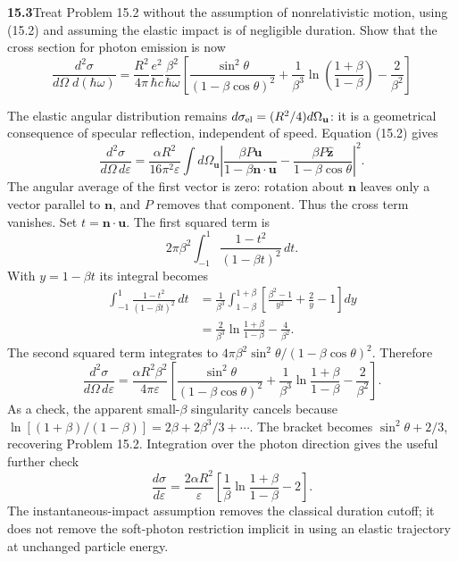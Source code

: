 \par\bigskip
\noindent\textbf{15.3}\quad Treat Problem 15.2 without the assumption of nonrelativistic motion, using (15.2) and assuming the elastic impact is of negligible duration. Show that the cross section for photon emission is now
\[
\frac{d^{2}\sigma}{d\Omega\;d(\hbar\omega)}=\frac{R^{2}}{4\pi}\frac{e^{2}}{\hbar c}\frac{\beta^{2}}{\hbar\omega}\left[\frac{\sin^{2}\theta}{(1-\beta\cos\theta)^{2}}+\frac{1}{\beta^{3}}\ln\!\left(\frac{1+\beta}{1-\beta}\right)-\frac{2}{\beta^{2}}\right]
\]
\solution

The elastic angular distribution remains $d\sigma_{\rm el}
=(R^2/4)d\Omega_{\mathbf u}$: it is a geometrical consequence of
specular reflection, independent of speed.  Equation (15.2) gives
\[
\frac{d^2\sigma}{d\Omega\,d\varepsilon}
=\frac{\alpha R^2}{16\pi^2\varepsilon}
\int d\Omega_{\mathbf u}\left|
 \frac{\beta P\mathbf u}{1-\beta\mathbf n\cdot\mathbf u}
 -\frac{\beta P\widehat{\mathbf z}}{1-\beta\cos\theta}
\right|^2.
\]
The angular average of the first vector is zero: rotation about
$\mathbf n$ leaves only a vector parallel to $\mathbf n$, and $P$
removes that component.  Thus the cross term vanishes.  Set
$t=\mathbf n\cdot\mathbf u$.  The first squared term is
\[
2\pi\beta^2\int_{-1}^{1}\frac{1-t^2}{(1-\beta t)^2}\,dt.
\]
With $y=1-\beta t$ its integral becomes
\begin{align*}
\int_{-1}^{1}\frac{1-t^2}{(1-\beta t)^2}\,dt
&=\frac1{\beta^3}\int_{1-\beta}^{1+\beta}
 \left[\frac{\beta^2-1}{y^2}+\frac2y-1\right]dy\\
&=\frac2{\beta^3}\ln\frac{1+\beta}{1-\beta}
 -\frac4{\beta^2}.
\end{align*}
The second squared term integrates to
$4\pi\beta^2\sin^2\theta/(1-\beta\cos\theta)^2$.
Therefore
\[
\boxed{\frac{d^2\sigma}{d\Omega\,d\varepsilon}
=\frac{\alpha R^2\beta^2}{4\pi\varepsilon}
\left[\frac{\sin^2\theta}{(1-\beta\cos\theta)^2}
 +\frac1{\beta^3}\ln\frac{1+\beta}{1-\beta}
 -\frac2{\beta^2}\right].}
\]
As a check, the apparent small-$\beta$ singularity cancels because
$\ln[(1+\beta)/(1-\beta)]=2\beta+2\beta^3/3+\cdots$.
The bracket becomes $\sin^2\theta+2/3$, recovering Problem 15.2.
Integration over the photon direction gives the useful further check
\[
\frac{d\sigma}{d\varepsilon}
=\frac{2\alpha R^2}{\varepsilon}
\left[\frac1\beta\ln\frac{1+\beta}{1-\beta}-2\right].
\]
The instantaneous-impact assumption removes the classical duration
cutoff; it does not remove the soft-photon restriction implicit in
using an elastic trajectory at unchanged particle energy.

